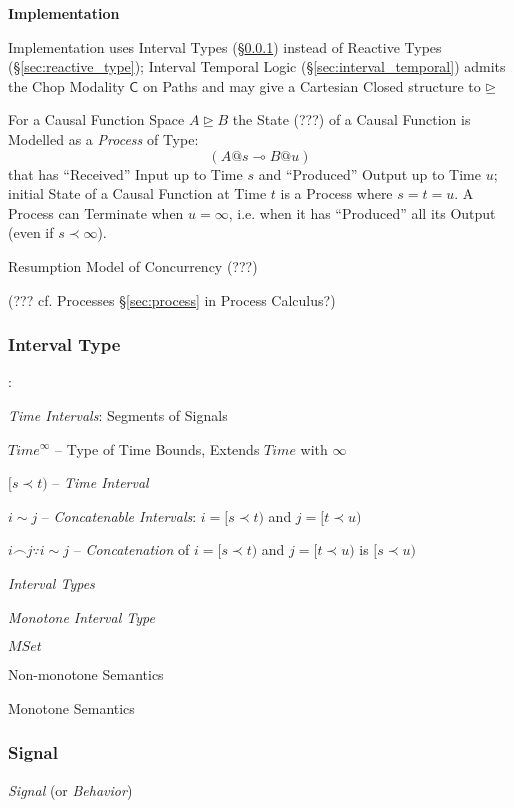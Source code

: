 \textbf{Implementation}

Implementation uses Interval Types (\S\ref{sec:interval_type}) instead
of Reactive Types (\S\ref{sec:reactive_type}); Interval Temporal Logic
(\S\ref{sec:interval_temporal}) admits the Chop Modality $\mathsf{C}$
on Paths and may give a Cartesian Closed structure to $\unrhd$

For a Causal Function Space $A \unrhd B$ the State (???) of a Causal
Function is Modelled as a \emph{Process} of Type:
\[
  (A @ s \multimap B @ u)
\]
that has ``Received'' Input up to Time $s$ and ``Produced'' Output up
to Time $u$; initial State of a Causal Function at Time $t$ is a
Process where $s = t = u$. A Process can Terminate when $u = \infty$,
i.e. when it has ``Produced'' all its Output (even if $s \prec
\infty$).

Resumption Model of Concurrency (???)

(??? cf. Processes \S\ref{sec:process} in Process Calculus?)



\subsubsection{Interval Type}\label{sec:interval_type}

\cite{jeffrey12}:

\emph{Time Intervals}: Segments of Signals

$Time^\infty$ -- Type of Time Bounds, Extends $Time$ with $\infty$

$[s \prec t)$ -- \emph{Time Interval}

$i \sim j$ -- \emph{Concatenable Intervals}: $i = [s \prec t)$ and $j
    = [t \prec u)$

$i \frown j \because i \sim j$ -- \emph{Concatenation} of $i = [s
        \prec t)$ and $j = [t \prec u)$ is $[s \prec u)$



\emph{Interval Types}

\emph{Monotone Interval Type}

$MSet$

Non-monotone Semantics

Monotone Semantics



\subsubsection{Signal}\label{sec:signal}

\emph{Signal} (or \emph{Behavior})

